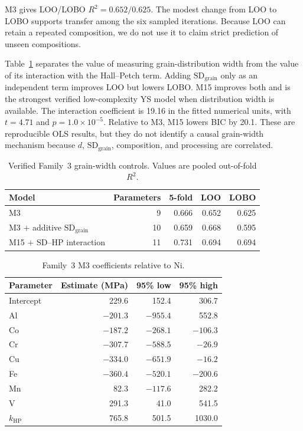 \documentclass[a4paper,11pt]{article}
\begin{document}
M3 gives LOO/LOBO $R^2=0.652/0.625$. The modest change from LOO to LOBO supports transfer among the six sampled iterations. Because LOO can retain a repeated composition, we do not use it to claim strict prediction of unseen compositions.

Table~\ref{tab:sdgrain} separates the value of measuring grain-distribution width from the value of its interaction with the Hall--Petch term. Adding $\mathrm{SD}_{\mathrm{grain}}$ only as an independent term improves LOO but lowers LOBO. M15 improves both and is the strongest verified low-complexity YS model when distribution width is available. The interaction coefficient is 19.16 in the fitted numerical units, with $t=4.71$ and $p=1.0\times10^{-5}$. Relative to M3, M15 lowers BIC by 20.1. These are reproducible OLS results, but they do not identify a causal grain-width mechanism because $d$, $\mathrm{SD}_{\mathrm{grain}}$, composition, and processing are correlated.

\begin{table}[H]
\centering
\caption{Verified Family~3 grain-width controls. Values are pooled out-of-fold $R^2$.}
\label{tab:sdgrain}
\small
\begin{tabular}{lrrrr}
\toprule
Model & Parameters & 5-fold & LOO & LOBO \\
\midrule
M3 & 9 & 0.666 & 0.652 & 0.625 \\
M3 $+$ additive $\mathrm{SD}_{\mathrm{grain}}$ & 10 & 0.659 & 0.668 & 0.595 \\
M15 $+$ SD--HP interaction & 11 & 0.731 & 0.694 & 0.694 \\
\bottomrule
\end{tabular}
\end{table}

\begin{table}[H]
\centering
\caption{Family~3 M3 coefficients relative to Ni.}
\label{tab:m3}
\begin{tabular}{lrrr}
\toprule
Parameter & Estimate (MPa) & 95\% low & 95\% high \\
\midrule
Intercept & 229.6 & 152.4 & 306.7 \\
Al & $-201.3$ & $-955.4$ & 552.8 \\
Co & $-187.2$ & $-268.1$ & $-106.3$ \\
Cr & $-307.7$ & $-588.5$ & $-26.9$ \\
Cu & $-334.0$ & $-651.9$ & $-16.2$ \\
Fe & $-360.4$ & $-520.1$ & $-200.6$ \\
Mn & 82.3 & $-117.6$ & 282.2 \\
V & 291.3 & 41.0 & 541.5 \\
$k_{\mathrm{HP}}$ & 765.8 & 501.5 & 1030.0 \\
\bottomrule
\end{tabular}
\end{table}
\end{document}
